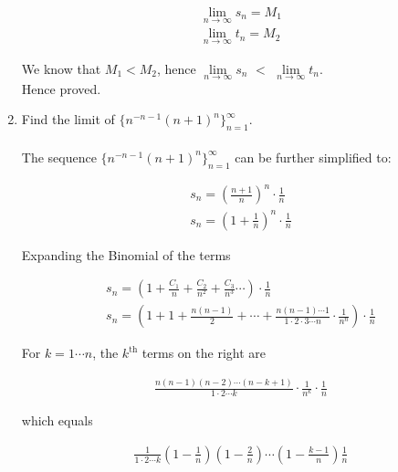 \documentclass[11pt, letterpaper]{article}
\begin{document}
\begin{enumerate}
{	\setcounter{equation}{0}
	
	\begin{eqnarray}
		\lim \limits_{n \to \infty} s_n = M_1 \\
		\lim \limits_{n \to \infty} t_n = M_2
	\end{eqnarray}
	
	We know that $M_1 < M_2$, hence $\lim \limits_{n \to \infty} s_n$ $<$ $\lim \limits_{n \to \infty} t_n$.\\
	Hence proved.
}

\item{Find the limit of $ \lbrace n^{-n-1}(n+1)^n \rbrace_{n=1}^\infty $.\\\\
	The sequence $ \lbrace n^{-n-1}(n+1)^n \rbrace_{n=1}^\infty $ can be further simplified to:
	
	\setcounter{equation}{0}
	
	\begin{eqnarray}
		s_n = \left(\frac{n+1}{n} \right)^n \cdot \frac{1}{n} \\
		s_n = \left( 1 + \frac{1}{n} \right)^n \cdot \frac{1}{n}	
	\end{eqnarray}
	
	\begin{center}
		Expanding the Binomial of the terms
	\end{center}
	
	\begin{eqnarray}
		s_n = \left(1 + \frac{C_1}{n} + \frac{C_2}{n^2} + \frac{C_3}{n^3}\cdots \right) \cdot \frac{1}{n} \\
		s_n = \left( 1+ 1 + \frac{n(n-1)}{2} + \cdots + \frac{n(n-1) \cdots1}{1 \cdot 2 \cdot 3 \cdots n} \cdot \frac{1}{n^n} \right) \cdot \frac{1}{n}
	\end{eqnarray}
	
	For $k=1 \cdots n $, the $k^{\mathrm{th}}$ terms on the right are

	\begin{eqnarray}
		\frac{n(n-1)(n-2) \cdots (n-k+1)}{1 \cdot 2 \cdots k} \cdot \frac{1}{n^k}\cdot \frac{1}{n}
	\end{eqnarray}
	
	which equals
	
	\begin{eqnarray}
		\frac{1}{1 \cdot2 \cdots k} \left( 1 - \frac{1}{n}\right) \left( 1 - \frac{2}{n}\right)\cdots \left( 1 - \frac{k-1}{n}\right)\frac{1}{n}
	\end{eqnarray}
	
}
\end{enumerate}
\end{document}
